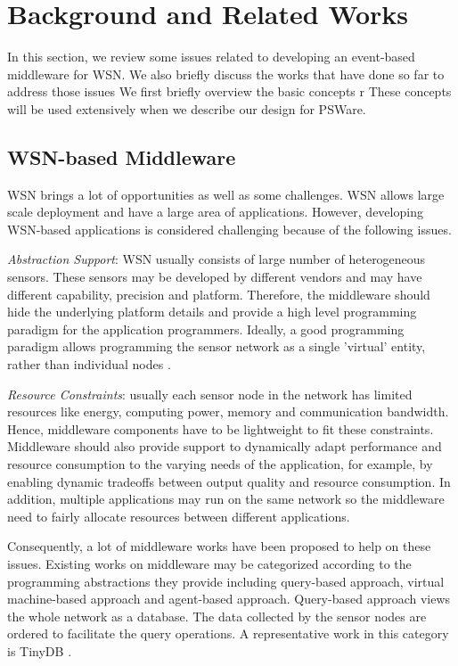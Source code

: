 \section{Background and Related Works}
\label{sec:background}
In this section, we review some issues related to developing an event-based middleware for WSN. We also briefly discuss the works that have done so far to address those issues
We first briefly overview the basic concepts r These concepts will be used extensively when we describe our design for PSWare.

\subsection{WSN-based Middleware}
WSN brings a lot of opportunities as well as some challenges. WSN allows large scale deployment and have a large area of applications. However, developing WSN-based applications is considered challenging because of the following issues.

\emph{Abstraction Support}: WSN usually consists of large number of heterogeneous sensors. These sensors may be developed by different vendors and may have different capability, precision and platform. Therefore, the middleware should hide the underlying platform details and provide a high level programming paradigm for the application programmers. Ideally, a good programming paradigm allows programming the sensor network as a single 'virtual' entity, rather than individual nodes \cite{programmingparadigms}.

\emph{Resource Constraints}: usually each sensor node in the network has limited resources like energy, computing power, memory and communication bandwidth. Hence, middleware components have to be lightweight to fit these constraints. Middleware should also provide support to dynamically adapt performance and resource consumption to the varying needs of the application, for example, by enabling dynamic tradeoffs between output quality and resource consumption. In addition, multiple applications may run on the same network so the middleware need to fairly allocate resources between different applications.

Consequently, a lot of middleware works have been proposed to help on these issues. Existing works on middleware may be categorized according to the programming abstractions they provide including query-based approach, virtual machine-based approach and agent-based approach. Query-based approach views the whole network as a database. The data collected by the sensor nodes are ordered to facilitate the query operations. A representative work in this category is TinyDB \cite{tinydb}.


